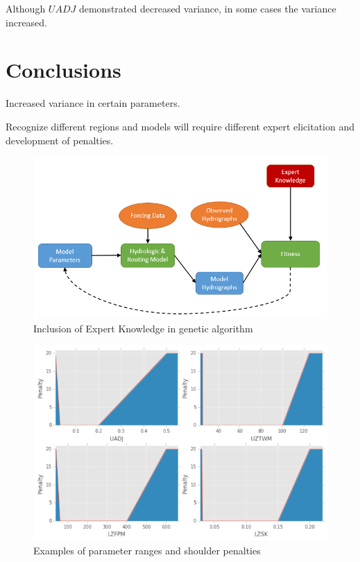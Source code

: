 \documentclass[11pt]{article} %
\begin{document}
Although $UADJ$ demonstrated decreased variance, in some cases the variance increased.

\section{Conclusions}

Increased variance in certain parameters.

Recognize different regions and models will require different expert elicitation and development of penalties.





\begin{figure}
\centering
\noindent\includegraphics[scale=.7]{./Figures/Process.png} 
\caption{Inclusion of Expert Knowledge in genetic algorithm}
\label{Process}
\end{figure}

\begin{figure}
\centering
\noindent\includegraphics[scale=.7]{./Figures/Parameter_Penalties.png} 
\caption{Examples of parameter ranges and shoulder penalties}
\label{Param_Penalty}
\end{figure}
\end{document}
